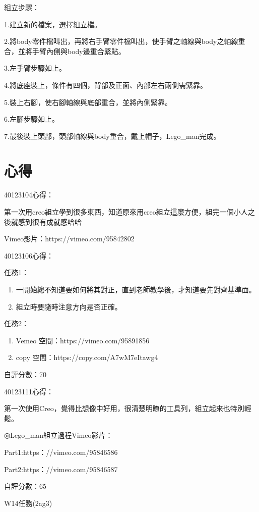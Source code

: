 \documentclass[]{article}
\begin{document}
組立步驟：

1.建立新的檔案，選擇組立檔。

2.將body零件檔叫出，再將右手臂零件檔叫出，使手臂之軸線與body之軸線重合，並將手臂內側與body邊重合緊貼。

3.左手臂步驟如上。

4.將底座裝上，條件有四個，背部及正面、內部左右兩側需緊靠。

5.裝上右腳，使右腳軸線與底部重合，並將內側緊靠。

6.左腳步驟如上。

7.最後裝上頭部，頭部軸線與body重合，戴上帽子，Lego\_man完成。

\section{心得}\label{ux5fc3ux5f97}

40123104心得：

第一次用creo組立學到很多東西，知道原來用creo組立這麼方便，組完一個小人之後就感到很有成就感哈哈

Vimeo影片：https://vimeo.com/95842802

40123106心得：

任務1：

\begin{enumerate}
\def\labelenumi{\arabic{enumi}.}
\item
  一開始總不知道要如何將其對正，直到老師教學後，才知道要先對齊基準面。
\item
  組立時要隨時注意方向是否正確。
\end{enumerate}

任務2：

\begin{enumerate}
\def\labelenumi{\arabic{enumi}.}
\item
  Vemeo 空間：https://vimeo.com/95891856
\item
  copy 空間：https://copy.com/A7wM7eItawg4
\end{enumerate}

自評分數：70

40123111心得：

第一次使用Creo，覺得比想像中好用，很清楚明瞭的工具列，組立起來也特別輕鬆。

◎Lego\_man組立過程Vimeo影片：

Part1:https：//vimeo.com/95846586

Part2:https：//vimeo.com/95846587

自評分數：65

W14任務(2ag3)
\end{document}
